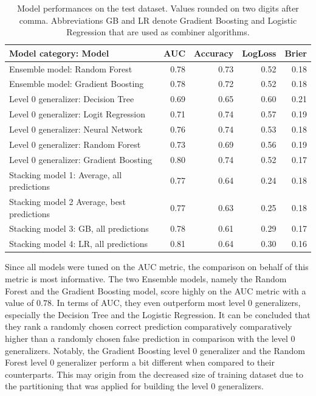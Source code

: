 \documentclass[12pt]{article}
\begin{document}
\begin{table}[ht]
\centering
\begin{tabular}{lrrrr}
  \hline
 Model category: Model & AUC & Accuracy & LogLoss & Brier\\ 
  \hline
Ensemble model: Random Forest & 0.78 & 0.73 & 0.52 & 0.18 \\ 
Ensemble model: Gradient Boosting & 0.78 & 0.72 & 0.52 & 0.18 \\
\hline 
  Level 0 generalizer: Decision Tree & 0.69 & 0.65 & 0.60 & 0.21 \\ 
  Level 0 generalizer: Logit Regression & 0.71 & 0.74 & 0.57 & 0.19 \\ 
  Level 0 generalizer: Neural Network & 0.76 & 0.74 & 0.53 & 0.18 \\ 
  Level 0 generalizer: Random Forest & 0.73 & 0.69 & 0.56 & 0.19 \\ 
  Level 0 generalizer: Gradient Boosting & 0.80 & 0.74 & 0.52 & 0.17 \\ 
\hline
  Stacking model 1: Average, all predictions & 0.77 & 0.64 & 0.24 & 0.18 \\ 
  Stacking model 2 Average, best predictions & 0.77 & 0.63 & 0.25 & 0.18 \\ 
  Stacking model 3: GB, all predictions & 0.78 & 0.61 & 0.29 & 0.17 \\ 
  Stacking model 4: LR, all predictions & 0.81 & 0.64 & 0.30 & 0.16 \\ 
   \hline
\end{tabular}
\caption[Model performances on the test dataset]{Model performances on the test dataset. Values rounded on two digits after comma. Abbreviations GB and LR denote Gradient Boosting and Logistic Regression that are used as combiner algorithms.}\label{eval}
\end{table}

\noindent Since all models were tuned on the AUC metric, the comparison on behalf of this metric is most informative. The two Ensemble models, namely the Random Forest and the Gradient Boosting model, score highly on the AUC metric with a value of $0.78$. In terms of AUC, they even outperform most level 0 generalizers, especially the Decision Tree and the Logistic Regression. It can be concluded that they rank a randomly chosen correct prediction comparatively comparatively higher than a randomly chosen false prediction in comparison with the level 0 generalizers. Notably, the Gradient Boosting level 0 generalizer and the Random Forest level 0 generalizer perform a bit different when compared to their counterparts. This may origin from the decreased size of training dataset due to the partitioning that was applied for building the level 0 generalizers. 
\end{document}

